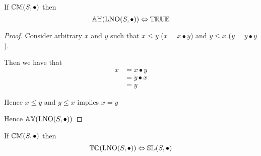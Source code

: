 \begin{theorem} \label{thm:lno_antisymmetric}
If ${\mathbb{CM}}(S, \bullet)$ then
\begin{equation*}
{\mathbb{AY}}(\mathrm{LNO}(S,\bullet)) \Leftrightarrow {\mathbb{TRUE}}
\end{equation*}
\end{theorem}

\begin{proof}

Consider arbitrary $x$ and $y$ such that $x \leq y$ ($x = x \bullet y$) and $y \leq x$ ($y = y \bullet y$). 

\begin{ind}

Then we have that
\begin{align*}
x 	& = x \bullet y \\
	& = y \bullet x \\
	& = y
\end{align*}

Hence $x \leq y$ and $y \leq x$ implies $x = y$
\end{ind}

Hence ${\mathbb{AY}}(\mathrm{LNO}(S,\bullet))$

\end{proof}




\begin{theorem} \label{thm:lno_total}
If ${\mathbb{CM}}(S,\bullet)$ then
\begin{equation*}
{\mathbb{TO}}(\mathrm{LNO}(S,\bullet)) \Leftrightarrow {\mathbb{SL}}(S, \bullet)
\end{equation*}
\end{theorem}


